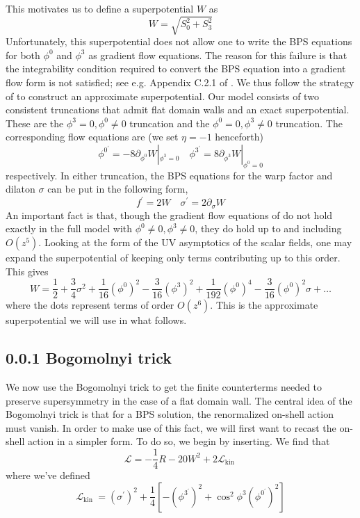 \documentclass{article}
\begin{document}
This motivates us to define a superpotential \(W\) as
\[
W=\sqrt{S_{0}^{2}+S_{3}^{2}}
\]
Unfortunately, this superpotential does not allow one to write the BPS equations for both \(\phi^{0}\) and \(\phi^{3}\) as gradient flow equations. The reason for this failure is that the integrability condition required to convert the BPS equation into a gradient flow form is not satisfied; see e.g. Appendix C.2.1 of . We thus follow the strategy of to construct an approximate superpotential. Our model consists of two consistent truncations that admit flat domain walls and an exact superpotential. These are the \(\phi^{3}=0, \phi^{0} \neq 0\) truncation and the \(\phi^{0}=0, \phi^{3} \neq 0\) truncation. The corresponding flow equations are (we set \(\eta=-1\) henceforth)
\[
\phi^{0^{\prime}}=-8 \partial_{\phi^{0}} W\left|_{\phi^{3}=0} \quad \phi^{3^{\prime}}=8 \partial_{\phi^{3}} W\right|_{\phi^{0}=0}
\]
respectively. In either truncation, the BPS equations for the warp factor and dilaton \(\sigma\) can be put in the following form,
\[
f^{\prime}=2 W \quad \sigma^{\prime}=2 \partial_{\sigma} W
\]
An important fact is that, though the gradient flow equations of do not hold exactly in the full model with \(\phi^{0} \neq 0, \phi^{3} \neq 0\), they do hold up to and including \(O\left(z^{5}\right)\). Looking at the form of the UV asymptotics of the scalar fields, one may expand the superpotential of keeping only terms contributing up to this order. This gives
\[
W=\frac{1}{2}+\frac{3}{4} \sigma^{2}+\frac{1}{16}\left(\phi^{0}\right)^{2}-\frac{3}{16}\left(\phi^{3}\right)^{2}+\frac{1}{192}\left(\phi^{0}\right)^{4}-\frac{3}{16}\left(\phi^{0}\right)^{2} \sigma+\ldots
\]
where the dots represent terms of order \(O\left(z^{6}\right)\). This is the approximate superpotential we will use in what follows.
\subsection*{0.0.1 Bogomolnyi trick}
We now use the Bogomolnyi trick to get the finite counterterms needed to preserve supersymmetry in the case of a flat domain wall. The central idea of the Bogomolnyi trick is that for a BPS solution, the renormalized on-shell action must vanish. In order to make use of this fact, we will first want to recast the on-shell action in a simpler form. To do so, we begin by inserting. We find that
\[
\mathcal{L}=-\frac{1}{4} R-20 W^{2}+2 \mathcal{L}_{\text {kin }}
\]
where we've defined
\[
\mathcal{L}_{\text {kin }}=\left(\sigma^{\prime}\right)^{2}+\frac{1}{4}\left[-\left(\phi^{3^{\prime}}\right)^{2}+\cos ^{2} \phi^{3}\left(\phi^{0^{\prime}}\right)^{2}\right]
\]
\end{document}
